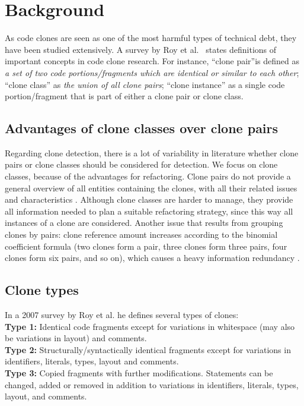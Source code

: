 \documentclass[a4paper]{article}
\begin{document}
\section{Background}\label{chap:background}
As code clones are seen as one of the most harmful types of technical debt, they have been studied extensively. A survey by Roy et al.~\cite{roy2007survey} states definitions of important concepts in code clone research. For instance, ``clone pair''is defined as \textit{a set of two code portions/fragments which are identical or similar to each other}; ``clone class'' as \textit{the union of all clone pairs}; ``clone instance'' as a single code portion/fragment that is part of either a clone pair or clone class.

\subsection{Advantages of clone classes over clone pairs}\label{chap:cloneclasses}
Regarding clone detection, there is a lot of variability in literature whether clone pairs or clone classes should be considered for detection. We focus on clone classes, because of the advantages for refactoring. Clone pairs do not provide a general overview of all entities containing the clones, with all their related issues and characteristics \cite{fontana2012duplicated}. Although clone classes are harder to manage, they provide all information needed to plan a suitable refactoring strategy, since this way all instances of a clone are considered. Another issue that results from grouping clones by pairs: clone reference amount increases according to the binomial coefficient formula (two clones form a pair, three clones form three pairs, four clones form six pairs, and so on), which causes a heavy information redundancy \cite{fontana2012duplicated}.

\subsection{Clone types}\label{chap:backgroundclonetypes}
In a 2007 survey by Roy et al. \cite{roy2007survey} he defines several types of clones:\\
\textbf{Type 1:} Identical code fragments except for variations in whitespace (may also be variations in layout) and comments.\\
\textbf{Type 2:} Structurally/syntactically identical fragments except for variations in identifiers, literals, types, layout and comments.\\
\textbf{Type 3:} Copied fragments with further modifications. Statements can be changed, added or removed in addition to variations in identifiers, literals, types, layout, and comments.\\
\end{document}
